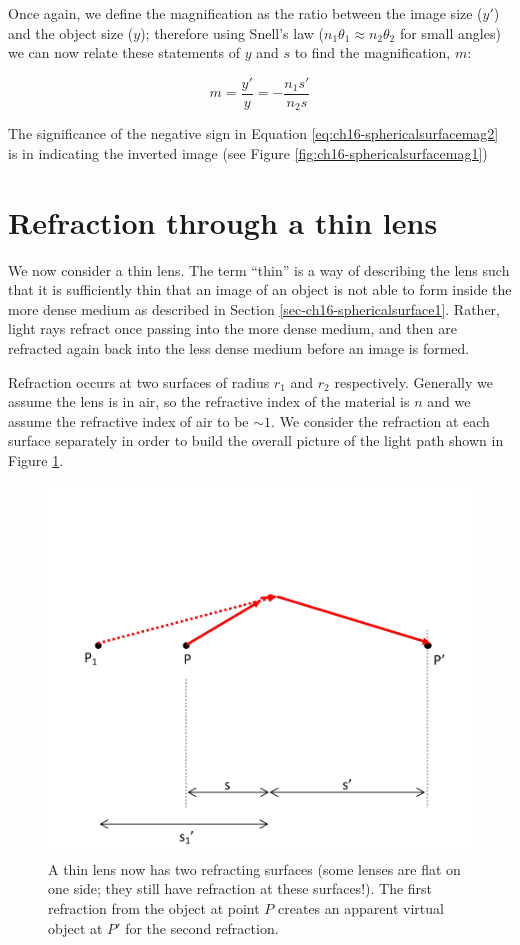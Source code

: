 \documentclass[
]{book}
\begin{document}
Once again, we define the magnification as the ratio between the image size (\(y'\)) and the object size (\(y\)); therefore using Snell's law (\(n_1 \theta_1 \approx n_2 \theta_2\) for small angles) we can now relate these statements of \(y\) and \(s\) to find the magnification, \(m\):

\begin{equation}
m = \frac{y'}{y} = -\frac{n_1 s'}{n_2 s}
\label{eq:ch16-sphericalsurfacemag2}
\end{equation}

The significance of the negative sign in Equation \eqref{eq:ch16-sphericalsurfacemag2} is in indicating the inverted image (see Figure \ref{fig:ch16-sphericalsurfacemag1})

\hypertarget{sec-ch16-thinlens1}{%
\section{Refraction through a thin lens}\label{sec-ch16-thinlens1}}

We now consider a thin lens. The term ``thin'' is a way of describing the lens such that it is sufficiently thin that an image of an object is not able to form inside the more dense medium as described in Section \ref{sec-ch16-sphericalsurface1}. Rather, light rays refract once passing into the more dense medium, and then are refracted again back into the less dense medium before an image is formed.

Refraction occurs at two surfaces of radius \(r_1\) and \(r_2\) respectively. Generally we assume the lens is in air, so the refractive index of the material is \(n\) and we assume the refractive index of air to be \(\sim 1\). We consider the refraction at each surface separately in order to build the overall picture of the light path shown in Figure \ref{fig:ch16-thinlens1}.

\begin{figure}

{\centering \includegraphics[width=0.7\linewidth]{visualisations/LaTeX/ch16-thinlightlens1} 

}

\caption{A thin lens now has two refracting surfaces (some lenses are flat on one side; they still have refraction at these surfaces!). The first refraction from the object at point $P$ creates an apparent virtual object at $P'$ for the second refraction.}\label{fig:ch16-thinlens1}
\end{figure}
\end{document}
